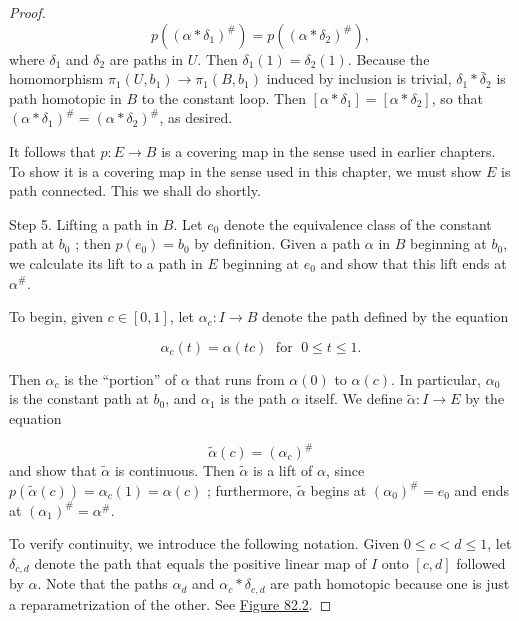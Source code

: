 \begin{proof}
\[
p( {( \alpha * {\delta }_{1}) }^{\# }) = p( {( \alpha * {\delta }_{2}) }^{\# }),
\]
where \({\delta }_{1}\) and \({\delta }_{2}\) are paths in \(U\). Then \({\delta }_{1}(1) = {\delta }_{2}(1)\). Because the homomorphism \({\pi }_{1}( {U,b_{1}}) \rightarrow {\pi }_{1}( {B,b_{1}})\) induced by inclusion is trivial, \({\delta }_{1} * \bar{\delta }_{2}\) is path homotopic in \(B\) to the constant loop. Then \([ {\alpha * {\delta }_{1}}] = [ {\alpha * {\delta }_{2}}]\), so that \({( \alpha * {\delta }_{1}) }^{\# } = {( \alpha * {\delta }_{2}) }^{\# }\), as desired.

It follows that \(p : E \rightarrow B\) is a covering map in the sense used in earlier chapters. To show it is a covering map in the sense used in this chapter, we must show \(E\) is path connected. This we shall do shortly.

Step 5. Lifting a path in \(B\). Let \(e_{0}\) denote the equivalence class of the constant path at \(b_{0}\) ; then \(p( e_{0}) = b_{0}\) by definition. Given a path \(\alpha\) in \(B\) beginning at \(b_{0}\), we calculate its lift to a path in \(E\) beginning at \(e_{0}\) and show that this lift ends at \({\alpha }^{\# }\).

To begin, given \(c \in [ {0,1}]\), let \({\alpha }_{c} : I \rightarrow B\) denote the path defined by the equation

\[
{\alpha }_{c}( t) = \alpha ( {tc}) \;\text{ for }\;0 \leq t \leq 1.
\]

Then \({\alpha }_{c}\) is the ``portion'' of \(\alpha\) that runs from \(\alpha ( 0)\) to \(\alpha ( c)\). In particular, \({\alpha }_{0}\) is the constant path at \(b_{0}\), and \({\alpha }_{1}\) is the path \(\alpha\) itself. We define \(\widetilde{\alpha } : I \rightarrow E\) by the equation

\[
\widetilde{\alpha }( c) = {( {\alpha }_{c}) }^{\# }
\]
and show that \(\widetilde{\alpha }\) is continuous. Then \(\widetilde{\alpha }\) is a lift of \(\alpha\), since \(p( {\widetilde{\alpha }( c) }) = {\alpha }_{c}(1) = \alpha ( c)\) ; furthermore, \(\widetilde{\alpha }\) begins at \({( {\alpha }_{0}) }^{\# } = e_{0}\) and ends at \({( {\alpha }_{1}) }^{\# } = {\alpha }^{\# }\).

To verify continuity, we introduce the following notation. Given \(0 \leq c < d \leq 1\), let \({\delta }_{c,d}\) denote the path that equals the positive linear map of \(I\) onto \([ {c,d}]\) followed by \(\alpha\). Note that the paths \({\alpha }_{d}\) and \({\alpha }_{c} * {\delta }_{c,d}\) are path homotopic because one is just a reparametrization of the other. See \hyperref[fig:82.2]{Figure 82.2}.


\end{proof}
